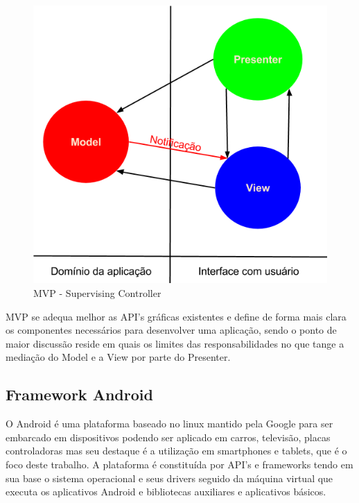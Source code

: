 \documentclass[conference]{IEEEtran}
\begin{document}
\begin{figure}[htb]
	\begin{center}
		\includegraphics[scale=0.25]{img/supervising_controller.png}
	\end{center}
	
	\caption{\label{fig:sup_controller} MVP - Supervising Controller}
\end{figure}

MVP se adequa melhor as API's gráficas existentes e define de forma mais clara
os componentes necessários para desenvolver uma aplicação, sendo o ponto de maior
discussão reside em quais os limites das responsabilidades no que tange a
mediação do Model e a View por parte do Presenter.

\subsection{Framework Android}
 
O Android é uma plataforma baseado no linux mantido pela Google para
ser embarcado em dispositivos podendo ser aplicado em carros, televisão, placas
controladoras mas seu destaque é a utilização em smartphones e
tablets, que é o foco deste trabalho. A plataforma é constituída por API's e
frameworks tendo em sua base o sistema operacional e seus drivers seguido da
máquina virtual que executa os aplicativos Android e bibliotecas auxiliares e
aplicativos básicos. %
\end{document}
